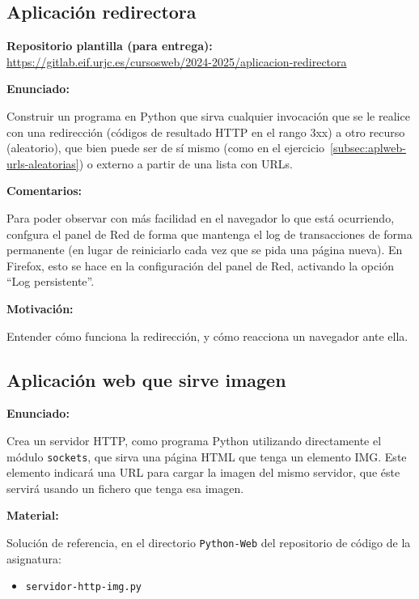 \subsection{Aplicación redirectora}
\label{subsec:aplweb-redirectora}

\textbf{Repositorio plantilla (para entrega):} \\
\url{https://gitlab.eif.urjc.es/cursosweb/2024-2025/aplicacion-redirectora}

\textbf{Enunciado:}

Construir un programa en Python que sirva cualquier invocación que se le realice con una redirección (códigos de resultado HTTP en el rango 3xx) a otro recurso (aleatorio), que bien puede ser de sí mismo (como en el ejercicio~\ref{subsec:aplweb-urls-aleatorias}) o externo a partir de una lista con URLs.

\textbf{Comentarios:}

Para poder observar con más facilidad en el navegador lo que está ocurriendo, confgura el panel de Red de forma que mantenga el log de transacciones de forma permanente (en lugar de reiniciarlo cada vez que se pida una página nueva). En Firefox, esto se hace en la configuración del panel de Red, activando la opción ``Log persistente''.


\textbf{Motivación:}

Entender cómo funciona la redirección, y cómo reacciona un navegador ante ella.

\subsection{Aplicación web que sirve imagen}
\label{subsec:aplweb-img}

\textbf{Enunciado:}

Crea un servidor HTTP, como programa Python utilizando directamente el módulo \verb|sockets|, que sirva una página HTML que tenga un elemento IMG. Este elemento indicará una URL para cargar la imagen del mismo servidor, que éste servirá usando un fichero que tenga esa imagen.

\textbf{Material:}

Solución de referencia, en el directorio \verb|Python-Web| del repositorio de código de la asignatura:


\begin{itemize}
\item \verb|servidor-http-img.py|
\end{itemize}

